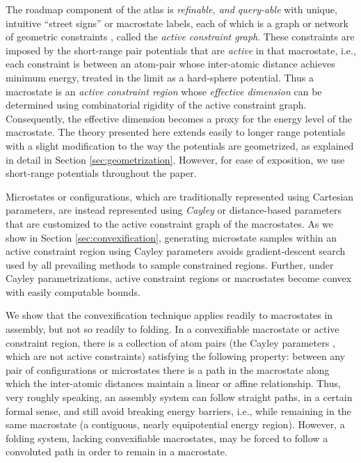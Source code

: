 \documentclass[]{article}
\begin{document}
The roadmap component of the atlas is \emph{refinable, and query-able} with
unique, intuitive ``street signs'' or macrostate labels, each of which is a
graph or network of geometric constraints \cite{SJS:Handbook}, called the
\emph{active constraint graph}. These constraints are imposed by the
short-range pair potentials that are \emph{active} in that macrostate, i.e.,
each constraint is between an atom-pair whose inter-atomic distance achieves
minimum energy, treated in the limit as a hard-sphere potential. Thus a
macrostate is an \emph{active constraint region} whose \emph{effective
dimension} can be determined using combinatorial rigidity \cite{SJS:Handbook}
of the active constraint graph. Consequently, the effective dimension becomes
a proxy for the energy level of the macrostate. The theory presented here
extends easily to longer range potentials with a slight modification to the way
the potentials are geometrized, as explained in detail in Section
\ref{sec:geometrization}. However, for ease of exposition, we use short-range
potentials throughout the paper.

Microstates or configurations, which are traditionally represented using
Cartesian parameters, are instead represented using \emph{Cayley} or
distance-based parameters that are customized to the active constraint graph of
the macrostates. As we show in Section \ref{sec:convexification}, generating
microstate samples within an active constraint region using Cayley parameters
avoids gradient-descent search used by all prevailing methods to sample
constrained regions. Further, under Cayley parametrizations, active constraint
regions or macrostates become convex with easily computable bounds. 

We show that the convexification technique applies readily to macrostates in
assembly, but not so readily to folding. In a convexifiable macrostate or
active constraint region, there is a collection of atom pairs (the Cayley
parameters , which are not active constraints) satisfying the following
property: between any pair of configurations or microstates there is a path in
the macrostate along which the inter-atomic distances  maintain a linear or
affine relationship. Thus, very roughly speaking, an assembly system can follow
straight paths, in a certain formal sense, and still avoid breaking energy
barriers, i.e., while remaining in the same macrostate (a contiguous, nearly
equipotential energy region). However, a folding system, lacking convexifiable
macrostates, may be forced to follow a convoluted path in order to remain in a
macrostate.
\end{document}
